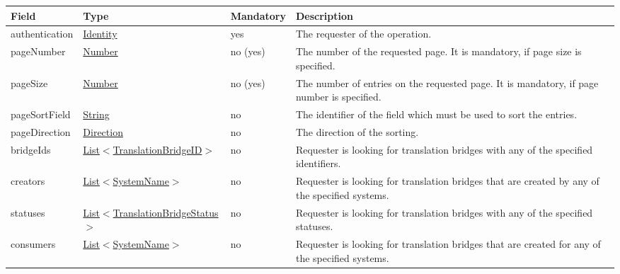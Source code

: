 \documentclass[a4paper]{arrowhead}
\newcommand{\pref}[1]{{\textcolor{ArrowheadGrey}{\hyperref[sec:model:primitives:#1]{#1}}}}
\begin{document}
\begin{table}[ht!]
\begin{tabularx}{\textwidth}{| p{3.5cm} | p{4.6cm} | p{2cm} | X |} \hline
\rowcolor{gray!33} Field & Type & Mandatory & Description \\ \hline
authentication & \hyperref[sec:model:Identity]{Identity} & yes & The requester of the ope\-ration. \\ \hline
pageNumber & \pref{Number} & no (yes) & The number of the requested page. It is mandatory, if page size is specified. \\ \hline
pageSize & \pref{Number} & no (yes) & The number of entries on the requested page. It is mandatory, if page number is specified. \\ \hline
pageSortField & \pref{String} & no & The identifier of the field which must be used to sort the entries. \\ \hline
pageDirection & \pref{Direction} & no & The direction of the sorting. \\ \hline
bridgeIds &  \pref{List}$<$\pref{TranslationBridgeID}$>$ & no & Requester is looking for translation bridges with any of the spe\-cified identifiers. \\ \hline
creators &  \pref{List}$<$\pref{SystemName}$>$ & no & Requester is looking for translation bridges that are created by any of the specified systems. \\ \hline
statuses & \pref{List}$<$\pref{TranslationBridgeStatus}$>$ & no & Requester is looking for translation bridges with any of the specified statuses. \\ \hline
consumers &  \pref{List}$<$\pref{SystemName}$>$ & no & Requester is looking for translation bridges that are created for any of the specified systems. \\ \hline
\end{tabularx}
\end{table}
\end{document}
